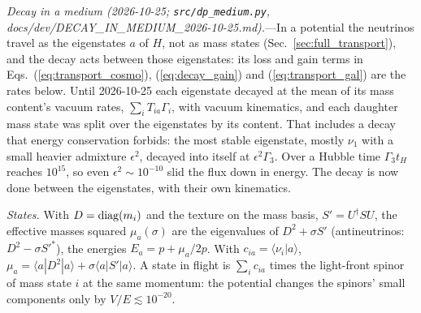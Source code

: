 \documentclass[11pt,a4paper]{article}
\newcommand{\file}[1]{\nolinkurl{#1}}
\begin{document}
\textit{Decay in a medium (2026-10-25; \file{src/dp\_medium.py}, docs/dev/DECAY\_IN\_MEDIUM\_2026-10-25.md).}---In a
potential the neutrinos travel as the eigenstates $a$ of $H$, not as mass states
(Sec.~\ref{sec:full_transport}), and the decay acts between those eigenstates: its loss and gain terms in
Eqs.~(\ref{eq:transport_cosmo}), (\ref{eq:decay_gain}) and (\ref{eq:transport_gal}) are the rates below. Until
2026-10-25 each eigenstate decayed at the mean of its mass content's vacuum rates, $\sum_iT_{ia}\Gamma_i$, with
vacuum kinematics, and each daughter mass state was split over the eigenstates by its content. That includes a decay
that energy conservation forbids: the most stable eigenstate, mostly $\nu_1$ with a small heavier admixture
$\epsilon^2$, decayed into itself at $\epsilon^2\Gamma_3$. Over a Hubble time $\Gamma_3t_H$ reaches $10^{15}$, so even
$\epsilon^2\sim10^{-10}$ slid the flux down in energy. The decay is now done between the eigenstates, with their own
kinematics.

\emph{States.} With $D = {\rm diag}(m_i)$ and the texture on the mass basis, $S' = U^\dagger SU$, the effective
masses squared $\mu_a(\sigma)$ are the eigenvalues of $D^2 + \sigma S'$ (antineutrinos: $D^2 - \sigma S'^*$), the
energies $E_a = p + \mu_a/2p$. With $c_{ia} = \langle\nu_i|a\rangle$, $\mu_a = \langle a|D^2|a\rangle +
\sigma\langle a|S'|a\rangle$. A state in flight is $\sum_ic_{ia}$ times the light-front spinor of mass state $i$ at the
same momentum: the potential changes the spinors' small components only by $V/E\lesssim10^{-20}$.
\end{document}
